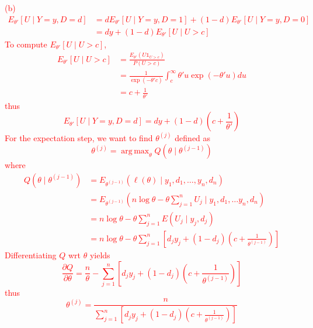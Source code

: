 \documentclass[12pt]{article}
\newcommand{\1}{\mathds 1}
\DeclareMathOperator*{\argmax}{arg\,max}
\begin{document}
\begin{enumerate}
\textcolor{red}{
(b) 
\begin{align*}
	E_{\theta'}[U \mid Y = y, D = d] &= d E_{\theta'}[U \mid Y = y, D = 1] + (1 - d) E_{\theta '} [U \mid Y = y, D = 0]\\
	&= d y + (1 - d) E_{\theta'} [U \mid U > c]
\end{align*}
To compute $E_{\theta'}[U \mid U > c]$, 
\begin{align*}
	E_{\theta'} [U \mid U > c] &= \frac{E_{\theta'} (U \1_{U > c})}{P(U > c)}\\
	&= \frac{1}{\exp(-\theta' c)} \int_c^\infty \theta' u \exp(-\theta' u)du\\
	&= c + \frac 1 {\theta'}
\end{align*}
thus 
\begin{equation*}
	E_{\theta'}[U \mid Y = y, D = d] = dy + (1 - d) \left(c + \frac{1}{\theta'}\right)
\end{equation*}
For the expectation step, we want to find $\theta^{(j)}$ defined as  
\begin{equation*}
	\theta^{(j)} = \argmax_{\theta} Q(\theta \mid \theta^{(j-1)})
\end{equation*}
where 
\begin{align*}
	Q(\theta \mid \theta^{(j-1)}) &= E_{\theta^{(j-1)}} (\ell(\theta) \mid y_1, d_1,\ldots, y_n, d_n)\\
	&= E_{\theta^{(j-1)}} \left(n \log \theta - \theta \sum_{j=1}^n U_j \mid y_1, d_1,\ldots y_n, d_n\right)\\
	&= n\log \theta - \theta \sum_{j=1}^n E(U_j \mid y_j, d_j)\\
	&= n\log \theta - \theta \sum_{j=1}^n \left[d_j y_j + (1 - d_j) \left(c + \frac{1}{\theta^{(j-1)}}\right)\right]
\end{align*}
Differentiating $Q$ wrt $\theta$ yields 
\begin{equation*}
	\frac{\partial Q}{\partial \theta} = \frac n \theta - \sum_{j=1}^n \left[d_j y_j + (1 - d_j) \left( c + \frac{1}{\theta^{(j-1)}}\right)\right]
\end{equation*}
thus 
\begin{equation*}
	\theta^{(j)} = \frac{n}{\sum_{j=1}^n \left[d_j y_j + (1 - d_j) \left( c + \frac{1}{\theta^{(j-1)}}\right)\right]}
\end{equation*}
}


\end{enumerate}
\end{document}
